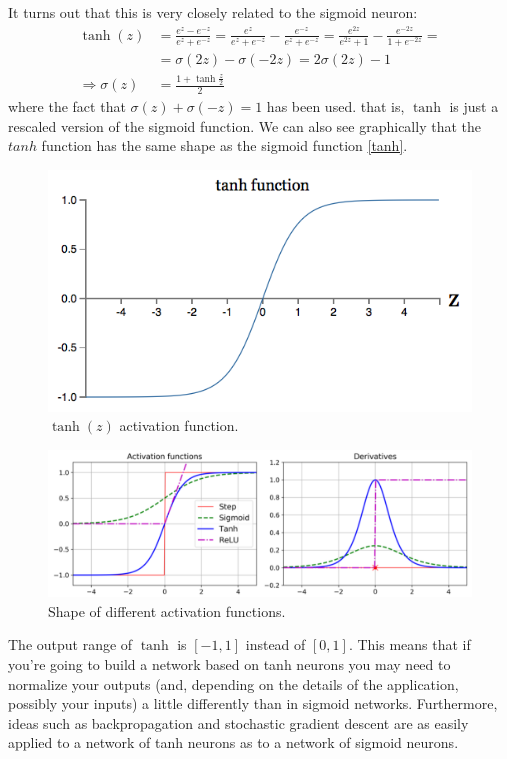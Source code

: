 It turns out that this is very closely related to the sigmoid neuron: 
\begin{equation}
\begin{aligned}
\tanh(z) &= \frac{e^z - e^{-z}}{e^z + e^{-z}} = \frac{e^z }{e^z + e^{-z}} - \frac{ e^{-z}}{e^z + e^{-z}}= \frac{e^{2z} }{e^{2z} + 1} - \frac{ e^{-2z}}{1 + e^{-2z}} = \\ &=\sigma(2z) - \sigma(-2z) = 2\sigma(2z) - 1\\
\Rightarrow\sigma(z) &= \frac{1+\tanh{\frac{z}{2}}}{2}
\end{aligned}
\end{equation}
where the fact that $\sigma(z) + \sigma(-z) = 1$ has been used.
that is, $\tanh$ is just a rescaled version of the sigmoid function. We can also see graphically that the $tanh$ function has the same shape as the sigmoid function \autoref{tanh}.
 \begin{figure}
\centering
 \includegraphics[scale=0.6]{img/tanh}
 \caption{$\tanh(z)$ activation function.}
 \label{tanh}
 \end{figure}
 \begin{figure}
\includegraphics[scale=0.4]{img/activationFunctions}
\caption{Shape of different activation functions.}
\label{activationFunctions}
\end{figure}
 The output range of $\tanh$ is $[-1,1]$ instead of $[0,1]$. This means that if you're going to build a network based on tanh neurons you may need to normalize your outputs (and, depending on the details of the application, possibly your inputs) a little differently than in sigmoid networks. Furthermore, ideas such as backpropagation and stochastic gradient descent are as easily applied to a network of tanh neurons as to a network of sigmoid neurons.
 
